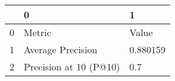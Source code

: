 \begin{tabular}{lll}
\toprule
{} &                       0 &         1 \\
\midrule
0 &                  Metric &     Value \\
1 &       Average Precision &  0.880159 \\
2 &  Precision at 10 (P@10) &       0.7 \\
\bottomrule
\end{tabular}
